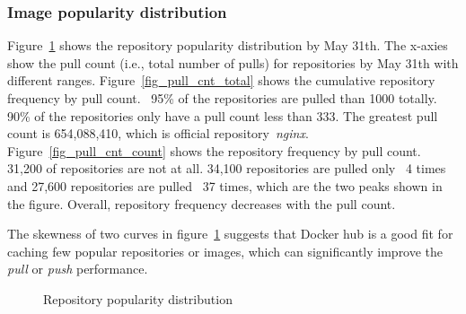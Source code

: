 \subsubsection{Image popularity distribution}

Figure~\ref{fig-pop} shows the repository popularity distribution by May 31th. The x-axies show the pull count (i.e., total number of pulls) for repositories by May 31th with different ranges.
Figure~\ref{fig_pull_cnt_total} shows the cumulative repository frequency by pull count. ~95\% of the repositories are pulled than 1000 totally. 90\% of the repositories only have a pull count less than 333. The greatest pull count is 654,088,410, which is official repository~\textit{nginx}. 
Figure~\ref{fig_pull_cnt_count} shows the repository frequency by pull count. 31,200 of repositories are not at all.  
34,100 repositories are pulled only ~4 times and 27,600 repositories are pulled ~37 times, which are the two peaks shown in the figure.
Overall, repository frequency decreases with the pull count.

The skewness of two curves in figure~\ref{fig-pop} suggests that Docker hub is a good fit for caching few popular repositories or images, which can significantly improve the \textit{pull} or \textit{push} performance.      

\begin{figure}[!t]
	\centering
	\caption{Repository popularity distribution}
	\label{fig-pop}
\end{figure}

